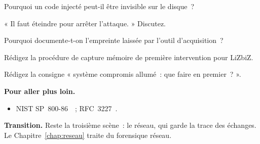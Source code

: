 \begin{boxexo}[title={\ding{45}\quad Exercice~13.6. Code injecté \niveaumoyen}]
Pourquoi un code injecté peut-il être invisible sur le disque~?
\end{boxexo}

\begin{boxexo}[title={\ding{45}\quad Exercice~13.7. Éteindre \niveaumoyen}]
« Il faut éteindre pour arrêter l'attaque. » Discutez.
\end{boxexo}

\begin{boxexo}[title={\ding{45}\quad Exercice~13.8. Empreinte \niveaumoyen}]
Pourquoi documente-t-on l'empreinte laissée par l'outil d'acquisition~?
\end{boxexo}

\begin{boxexo}[title={\ding{45}\quad Exercice~13.9. Procédure \niveauexpert}]
Rédigez la procédure de capture mémoire de première intervention pour LiZbiZ.
\end{boxexo}

\begin{boxexo}[title={\ding{45}\quad Exercice~13.10. Consigne \niveauexpert}]
Rédigez la consigne « système compromis allumé~: que faire en premier~? ».
\end{boxexo}

\bigskip

\begin{boxinfo}
\textbf{Pour aller plus loin.}
\begin{itemize}
    \item NIST SP~800-86~\cite{nist80086}~; RFC~3227~\cite{rfc3227}.
\end{itemize}
\end{boxinfo}

\begin{boxinfo}
\textbf{Transition.} Reste la troisième scène~: le réseau, qui garde la trace
des échanges. Le Chapitre~\ref{chap:reseau} traite du forensique réseau.
\end{boxinfo}

